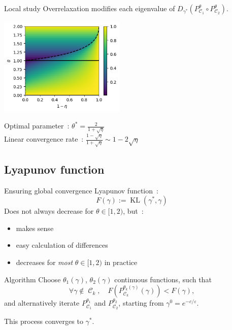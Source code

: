 \documentclass[compress]{beamer}
\DeclareMathOperator{\Ccal}{\mathcal{C}}
\DeclareMathOperator{\KL}{KL}
\renewcommand{\epsilon}{\varepsilon}
\begin{document}
\begin{frame}{Local study}
		Overrelaxation modifies each eigenvalue of $D_{\gamma^*}(P^\theta_{\Ccal_1} \circ P^\theta_{\Ccal_2})$.
		\begin{center}
			\includegraphics[width=6cm]{images/eigen_transform.png}
		\end{center}
		\pause
		Optimal parameter~: $\theta^* = \frac{2}{1+\sqrt{\eta}}$\\
		\pause
		Linear convergence rate~: $\frac{1-\sqrt{\eta}}{1+\sqrt{\eta}} \sim 1-2\sqrt{\eta}$
\end{frame}
\fi

\subsection{Lyapunov function}
\begin{frame}{Ensuring global convergence}
Lyapunov function~:
\[F(\gamma) := \KL(\gamma^*,\gamma)\]
\pause
Does not always decrease for $\theta \in [1,2)$, but~:
\begin{itemize}
	\item makes sense
	\item easy calculation of differences
	\item decreases for \emph{most} $\theta \in [1,2)$ in practice
\end{itemize}
\end{frame}

\begin{frame}{Algorithm}
Choose $\theta_1(\gamma)$, $\theta_2(\gamma)$ continuous functions, such that
\begin{equation}\label{eq:cond_theta_k}
\forall \gamma \notin \Ccal_k,\quad
F(P_{\Ccal_k}^{\theta_k(\gamma)}(\gamma)) < F(\gamma),
\end{equation}
and alternatively iterate $P_{\Ccal_1}^{\theta_1}$ and $P_{\Ccal_2}^{\theta_2}$, starting from $\gamma^0 = e^{-c/\epsilon}$.\\

\begin{theorem}
	This process converges to $\gamma^*$.
\end{theorem}
\end{frame}
\end{document}
